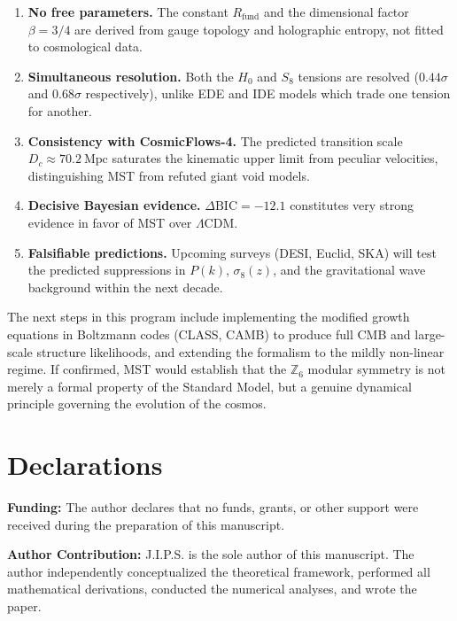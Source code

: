 \documentclass[12pt,a4paper]{article}
\theoremstyle{plain}
\theoremstyle{definition}
\theoremstyle{remark}
\begin{document}
\begin{enumerate}[label=(\roman*)]
    \item \textbf{No free parameters.} The constant \(R_{\text{fund}}\) and the dimensional factor \(\beta=3/4\) are derived from gauge topology and holographic entropy, not fitted to cosmological data.
    \item \textbf{Simultaneous resolution.} Both the \(H_0\) and \(S_8\) tensions are resolved (\(0.44\sigma\) and \(0.68\sigma\) respectively), unlike EDE and IDE models which trade one tension for another.
    \item \textbf{Consistency with CosmicFlows-4.} The predicted transition scale \(D_c \approx 70.2\ \text{Mpc}\) saturates the kinematic upper limit from peculiar velocities, distinguishing MST from refuted giant void models.
    \item \textbf{Decisive Bayesian evidence.} \(\Delta\text{BIC} = -12.1\) constitutes very strong evidence in favor of MST over \(\Lambda\)CDM.
    \item \textbf{Falsifiable predictions.} Upcoming surveys (DESI, Euclid, SKA) will test the predicted suppressions in \(P(k)\), \(\sigma_8(z)\), and the gravitational wave background within the next decade.
\end{enumerate}

The next steps in this program include implementing the modified growth equations in Boltzmann codes (CLASS, CAMB) to produce full CMB and large-scale structure likelihoods, and extending the formalism to the mildly non-linear regime. If confirmed, MST would establish that the \(\mathbb{Z}_6\) modular symmetry is not merely a formal property of the Standard Model, but a genuine dynamical principle governing the evolution of the cosmos.


\section*{Declarations}

\textbf{Funding:} The author declares that no funds, grants, or other support were received during the preparation of this manuscript.

\vspace{0.5em}
\noindent\textbf{Author Contribution:} J.I.P.S. is the sole author of this manuscript. The author independently conceptualized the theoretical framework, performed all mathematical derivations, conducted the numerical analyses, and wrote the paper.
\end{document}
